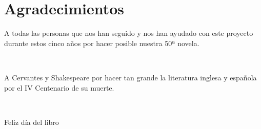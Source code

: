\chapter*{Agradecimientos}

{A todas las personas que nos han seguido y nos han ayudado con este proyecto
durante estos cinco años por hacer posible nuestra 50ª novela.}

~

{A Cervantes y Shakespeare por hacer tan grande la literatura inglesa y española
por el IV Centenario de su muerte.}

~

{Feliz día del libro}
